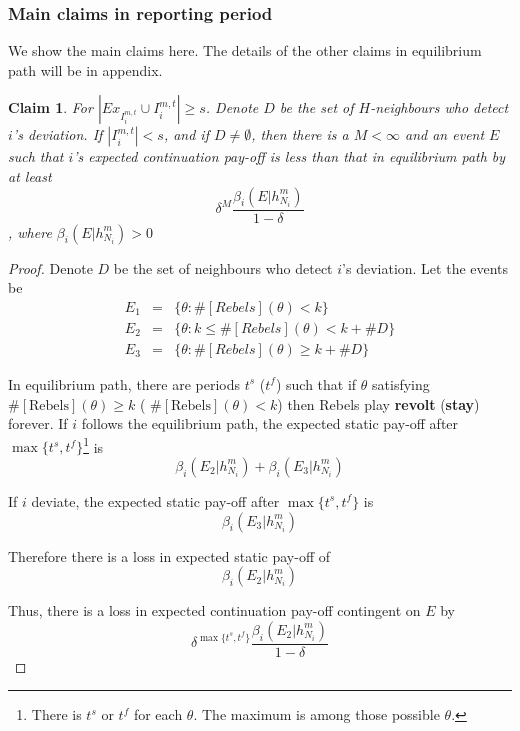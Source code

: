\documentclass[12pt]{article}
\newtheorem{claim}{Claim}[subsubsection]
\theoremstyle{remark}
\theoremstyle{remark}
\begin{document}
\subsubsection{Main claims in reporting period}

We show the main claims here. The details of the other claims in equilibrium path will be in appendix.


\begin{claim} 
\label{claim_detection_reporting_period}
For $|Ex_{I^{m,t}_i}\cup I^{m,t}_i|\geq s$. Denote $D$ be the set of $H$-neighbours who detect $i$'s deviation. If $|I^{m,t}_i|<s$, and if $D\neq \emptyset$, then there is a $M<\infty$ and an event $E$ such that $i$'s expected continuation pay-off is less than that in equilibrium path by at least 
\[\delta^{M}\frac{\beta_{i}(E|h^{m}_{N_i})}{1-\delta}\]
, where $\beta_{i}(E|h^{m}_{N_i})>0$
\end{claim}
\begin{proof}

Denote $D$ be the set of neighbours who detect $i$'s deviation. Let the events be
\begin{eqnarray*}
E_1 	&= &\{\theta: \#[Rebels](\theta)< k\}\\
E_2 	&= &\{\theta: k\leq \#[Rebels](\theta)<k+\# D\}\\
E_3 	&= &\{\theta: \#[Rebels](\theta)\geq k+\# D\}
\end{eqnarray*}

In equilibrium path, there are periods $t^{s}$ ($t^{f}$) such that if $\theta$ satisfying $\#[\text{Rebels}](\theta)\geq k$ ( $\#[\text{Rebels}](\theta)< k$) then Rebels play \textbf{revolt} (\textbf{stay}) forever. If $i$ follows the equilibrium path, the expected static pay-off after $\max\{t^s,t^f\}$\footnote{There is $t^{s}$ or $t^{f}$ for each $\theta$. The maximum is among those possible $\theta$.} is
 \[\beta_{i}(E_2|h^{m}_{N_i})+\beta_{i}(E_3|h^{m}_{N_i})\]

If $i$ deviate, the expected static pay-off after $\max\{t^s,t^f\}$ is
 \[\beta_{i}(E_3|h^{m}_{N_i})\]
 
Therefore there is a loss in expected static pay-off of
\[\beta_{i}(E_2|h^{m}_{N_i})\]

Thus, there is a loss in expected continuation pay-off contingent on $E$ by
\[\delta^{\max\{t^s,t^f\}}\frac{\beta_{i}(E_2|h^{m}_{N_i})}{1-\delta}\]

\end{proof}
\end{document}
